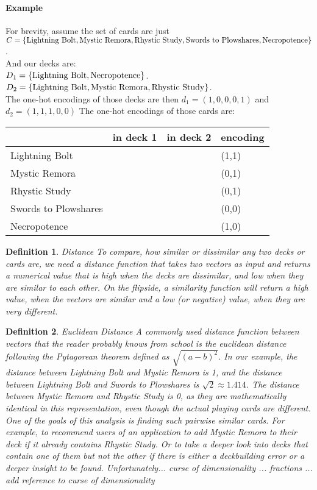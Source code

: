 \documentclass[a4]{article}
\newcommand{\cmark}{\ding{51}}
\newcommand{\xmark}{\ding{55}}
\newtheorem{definition}{Definition}
\begin{document}
\paragraph{Example}
For brevity, assume the set of cards are just\\
$C = \{\textnormal{Lightning Bolt}, \textnormal{Mystic Remora}, \textnormal{Rhystic Study}, \textnormal{Swords to Plowshares}, \textnormal{Necropotence}\}$.\\
And our decks are:\\
$D_1 = \{\textnormal{Lightning Bolt}, \textnormal{Necropotence}\}$.\\
$D_2 = \{\textnormal{Lightning Bolt}, \textnormal{Mystic Remora}, \textnormal{Rhystic Study}\}$.\\
The one-hot encodings of those decks are then $d_1 = (1,0,0,0,1) $ and $d_2 = (1,1,1,0,0)$
The one-hot encodings of those cards are:\\
\begin{tabular}{llll}
\toprule
			&in deck 1	&in deck 2	&encoding\\
\midrule
Lightning Bolt		&\cmark		&\cmark		&(1,1)\\
Mystic Remora		&\xmark		&\cmark		&(0,1)\\
Rhystic Study		&\xmark		&\cmark		&(0,1)\\
Swords to Plowshares	&\xmark		&\xmark		&(0,0)\\
Necropotence		&\cmark		&\xmark		&(1,0)\\
\bottomrule
\end{tabular}

\begin{definition}{Distance}
To compare, how similar or dissimilar any two decks or cards are, we need a distance function that takes two vectors as input and returns a numerical value that is high when the decks are dissimilar, and low when they are similar to each other.
On the flipside, a similarity function will return a high value, when the vectors are similar and a low (or negative) value, when they are very different.
\end{definition}

\begin{definition}{Euclidean Distance}
A commonly used distance function between vectors that the reader probably knows from school is the euclidean distance following the Pytagorean theorem defined as $\sqrt{(a-b)^2}$.
In our example, the distance between Lightning Bolt and Mystic Remora is 1, and the distance between Lightning Bolt and Swords to Plowshares is $\sqrt{2} \approx 1.414$.
The distance between Mystic Remora and Rhystic Study is 0, as they are mathematically identical in this representation, even though the actual playing cards are different.
One of the goals of this analysis is finding such pairwise similar cards.
For example, to recommend users of an application to add Mystic Remora to their deck if it already contains Rhystic Study.
Or to take a deeper look into decks that contain one of them but not the other if there is either a deckbuilding error or a deeper insight to be found.
Unfortunately... curse of dimensionality ... fractions ...
add reference to curse of dimensionality
\end{definition}
\end{document}

